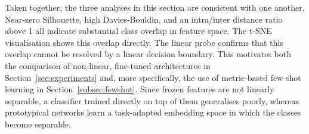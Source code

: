 Taken together, the three analyses in this section are consistent with one another. Near-zero Silhouette, high Davies-Bouldin, and an intra/inter distance ratio above 1 all indicate substantial class overlap in feature space. The t-SNE visualisation shows this overlap directly. The linear probe confirms that this overlap cannot be resolved by a linear decision boundary. This motivates both the comparison of non-linear, fine-tuned architectures in Section~\ref{sec:experiments} and, more specifically, the use of metric-based few-shot learning in Section~\ref{subsec:fewshot}. Since frozen features are not linearly separable, a classifier trained directly on top of them generalises poorly, whereas prototypical networks learn a task-adapted embedding space in which the classes become separable.